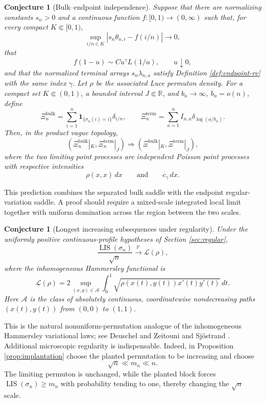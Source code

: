 \documentclass[11pt]{article}
\newtheorem{conjecture}[theorem]{Conjecture}
\theoremstyle{remark}
\newcommand{\Pp}{\mathbb P}
\newcommand{\Rr}{\mathbb R}
\newcommand{\one}{\mathbf 1}
\newcommand{\dd}{\,d}
\begin{document}
\begin{conjecture}[Bulk--endpoint independence]\label{conj:bulk-endpoint}
Suppose that there are normalizing constants $s_n>0$ and a continuous
function $f:[0,1)\to(0,\infty)$ such that, for every compact
$K\Subset[0,1)$,
\[
        \sup_{i/n\in K}|s_n\theta_{n,i}-f(i/n)|\longrightarrow0,
\]
that
\[
        f(1-u)\sim Cu^\gamma L(1/u),\qquad u\downarrow0,
\]
and that the normalized terminal arrays $s_n\lambda_{n,a}$ satisfy Definition
\ref{def:endpoint-rv} with the same index $\gamma$.  Let $\rho$ be the
associated Luce permuton density.  For a compact set $K\Subset(0,1)$, a bounded
interval $J\Subset\Rr$, and $b_n\to\infty$, $b_n=o(n)$, define
\[
        \Xi_n^{\mathrm{bulk}}
        =\sum_{i=1}^n
        \one_{\{\sigma_n(i)=i\}}\delta_{i/n},
        \qquad
        \Xi_n^{\mathrm{term}}
        =\sum_{a=1}^n I_{n,a}\delta_{\log(a/b_n)}.
\]
Then, in the product vague topology,
\[
        \left(
        \Xi_n^{\mathrm{bulk}}|_K,
        \Xi_n^{\mathrm{term}}|_J
        \right)
        \Rightarrow
        \left(\Xi^{\mathrm{bulk}}|_K,
        \Xi^{\mathrm{term}}|_J\right),
\]
where the two limiting point processes are independent Poisson point processes
with respective intensities
\[
        \rho(x,x)\dd x
        \qquad\text{and}\qquad
        c_\gamma\dd x.
\]
\end{conjecture}

This prediction combines the separated bulk saddle with the endpoint
regular-variation saddle.  A proof should require a mixed-scale integrated
local limit together with uniform domination across the region between the two
scales.

\begin{conjecture}[Longest increasing subsequences under regularity]
\label{conj:regular-lis}
Under the uniformly positive continuous-profile hypotheses of Section
\ref{sec:regular},
\[
        \frac{\operatorname{LIS}(\sigma_n)}{\sqrt n}
        \xrightarrow{\Pp}\mathcal L(\rho),
\]
where the inhomogeneous Hammersley functional is
\[
        \mathcal L(\rho)
        =2\sup_{(x,y)\in\mathcal A}
        \int_0^1
        \sqrt{\rho(x(t),y(t))x'(t)y'(t)}\dd t.
\]
Here $\mathcal A$ is the class of absolutely continuous, coordinatewise
nondecreasing paths $(x(t),y(t))$ from $(0,0)$ to $(1,1)$.
\end{conjecture}

This is the natural nonuniform-permutation analogue of the inhomogeneous
Hammersley variational laws; see Deuschel and Zeitouni
\cite{DeuschelZeitouni1999} and Sj\"ostrand \cite{Sjostrand2023}.  Additional
microscopic regularity is indispensable.  Indeed, in Proposition
\ref{prop:implantation} choose the planted permutation to be increasing and
choose
\[
        \sqrt n\ll m_n\ll n.
\]
The limiting permuton is unchanged, while the planted block forces
$\operatorname{LIS}(\sigma_n)\ge m_n$ with probability tending to one, thereby
changing the $\sqrt n$ scale.
\end{document}
